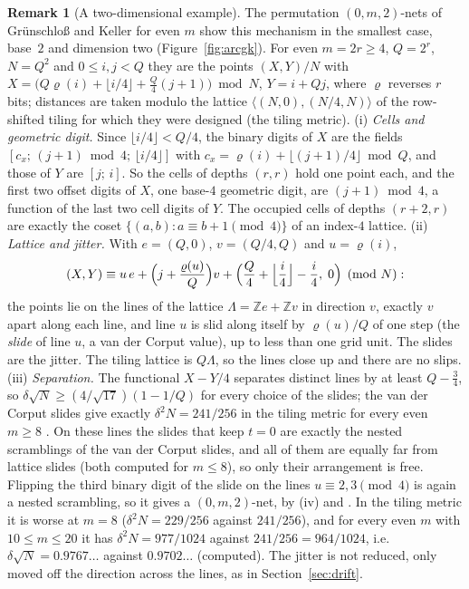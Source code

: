 \documentclass[11pt]{amsart}
\theoremstyle{definition}
\newtheorem{remark}[theorem]{Remark}
\theoremstyle{plain}
\newcommand{\Z}{\mathbb{Z}}
\begin{document}
\begin{remark}[A two-dimensional example]\label{rem:gk2d}
The permutation $(0,m,2)$-nets of Gr\"unschlo{\ss} and Keller \cite[Sec.~3]{GK09} for even $m$ show this mechanism in the smallest case, base~$2$ and dimension two (Figure~\ref{fig:arcgk}). For even $m=2r\ge4$, $Q=2^r$, $N=Q^2$ and $0\le i,j<Q$ they are the points $(X,Y)/N$ with $X=\bigl(Q\varrho(i)+\lfloor i/4\rfloor+\tfrac Q4(j+1)\bigr)\bmod N$, $Y=i+Qj$, where $\varrho$ reverses $r$ bits; distances are taken modulo the lattice $\langle(N,0),(N/4,N)\rangle$ of the row-shifted tiling for which they were designed \cite{GK09,Rud26} (the tiling metric).
(i) \emph{Cells and geometric digit.} Since $\lfloor i/4\rfloor<Q/4$, the binary digits of $X$ are the fields $[c_x;\,(j+1)\bmod4;\,\lfloor i/4\rfloor]$ with $c_x=\varrho(i)+\lfloor(j+1)/4\rfloor\bmod Q$, and those of $Y$ are $[j;\,i]$. So the cells of depths $(r,r)$ hold one point each, and the first two offset digits of $X$, one base-$4$ geometric digit, are $(j+1)\bmod4$, a function of the last two cell digits of $Y$. The occupied cells of depths $(r+2,r)$ are exactly the coset $\{(a,b):a\equiv b+1\pmod4\}$ of an index-$4$ lattice.
(ii) \emph{Lattice and jitter.} With $e=(Q,0)$, $v=(Q/4,Q)$ and $u=\varrho(i)$,
\[
(X,Y)\equiv u\,e+\Bigl(j+\frac{\varrho(u)}{Q}\Bigr)v+\Bigl(\frac Q4+\Bigl\lfloor\frac i4\Bigr\rfloor-\frac i4,\;0\Bigr)\pmod N:
\]
the points lie on the lines of the lattice $\Lambda=\Z e+\Z v$ in direction $v$, exactly $v$ apart along each line, and line $u$ is slid along itself by $\varrho(u)/Q$ of one step (the \emph{slide} of line $u$, a van der Corput value), up to less than one grid unit. The slides are the jitter. The tiling lattice is $Q\Lambda$, so the lines close up and there are no slips.
(iii) \emph{Separation.} The functional $X-Y/4$ separates distinct lines by at least $Q-\frac34$, so $\delta\sqrt N\ge(4/\sqrt{17})(1-1/Q)$ for every choice of the slides; the van der Corput slides give exactly $\delta^2N=241/256$ in the tiling metric for every even $m\ge8$ \cite{Rud26}. On these lines the slides that keep $t=0$ are exactly the nested scramblings of the van der Corput slides, and all of them are equally far from lattice slides (both computed for $m\le8$), so only their arrangement is free. Flipping the third binary digit of the slide on the lines $u\equiv2,3\pmod4$ is again a nested scrambling, so it gives a $(0,m,2)$-net, by (iv) and \cite{Owe95}. In the tiling metric it is worse at $m=8$ ($\delta^2N=229/256$ against $241/256$), and for every even $m$ with $10\le m\le20$ it has $\delta^2N=977/1024$ against $241/256=964/1024$, i.e.\ $\delta\sqrt N=0.9767\ldots$ against $0.9702\ldots$ (computed). The jitter is not reduced, only moved off the direction across the lines, as in Section~\ref{sec:drift}.

\end{remark}
\end{document}
